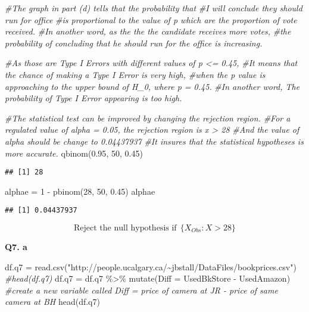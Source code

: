 \documentclass[
]{article}
\newenvironment{Shaded}{\begin{snugshade}}{\end{snugshade}}
\newcommand{\AttributeTok}[1]{\textcolor[rgb]{0.77,0.63,0.00}{#1}}
\newcommand{\CommentTok}[1]{\textcolor[rgb]{0.56,0.35,0.01}{\textit{#1}}}
\newcommand{\DecValTok}[1]{\textcolor[rgb]{0.00,0.00,0.81}{#1}}
\newcommand{\FloatTok}[1]{\textcolor[rgb]{0.00,0.00,0.81}{#1}}
\newcommand{\FunctionTok}[1]{\textcolor[rgb]{0.00,0.00,0.00}{#1}}
\newcommand{\NormalTok}[1]{#1}
\newcommand{\OtherTok}[1]{\textcolor[rgb]{0.56,0.35,0.01}{#1}}
\newcommand{\SpecialCharTok}[1]{\textcolor[rgb]{0.00,0.00,0.00}{#1}}
\newcommand{\StringTok}[1]{\textcolor[rgb]{0.31,0.60,0.02}{#1}}
\begin{document}
\begin{Shaded}
\begin{Highlighting}[]
\CommentTok{\#The graph in part (d) tells that the probability that }
\CommentTok{\#I will conclude they should run for office }
\CommentTok{\#is proportional to the value of p which are the proportion of vote received.}
\CommentTok{\#In another word, as the the the candidate receives more votes,}
\CommentTok{\#the probability of concluding that he should run for the office is increasing. }


\CommentTok{\#As those are Type I Errors with different values of p \textless{}= 0.45, }
\CommentTok{\#It means that the chance of making a Type I Error is very high, }
\CommentTok{\#when the p value is approaching to the upper bound of H\_0, where p = 0.45.}
\CommentTok{\#In another word, The probability of Type I Error appearing is too high.}

\CommentTok{\#The statistical test can be improved by changing the rejection region.}
\CommentTok{\#For a regulated value of alpha = 0.05, the rejection region is x \textgreater{} 28}
\CommentTok{\#And the value of alpha should be change to 0.04437937}
\CommentTok{\#It insures that the statistical hypotheses is more accurate.}
\FunctionTok{qbinom}\NormalTok{(}\FloatTok{0.95}\NormalTok{, }\DecValTok{50}\NormalTok{, }\FloatTok{0.45}\NormalTok{)}
\end{Highlighting}
\end{Shaded}

\begin{verbatim}
## [1] 28
\end{verbatim}

\begin{Shaded}
\begin{Highlighting}[]
\NormalTok{alphae }\OtherTok{=} \DecValTok{1} \SpecialCharTok{{-}} \FunctionTok{pbinom}\NormalTok{(}\DecValTok{28}\NormalTok{, }\DecValTok{50}\NormalTok{, }\FloatTok{0.45}\NormalTok{)}
\NormalTok{alphae}
\end{Highlighting}
\end{Shaded}

\begin{verbatim}
## [1] 0.04437937
\end{verbatim}

\[
\text{Reject the null hypothesis if} \:\: \{X_{Obs}: X > 28\}
\]

\textbf{Q7. a}

\begin{Shaded}
\begin{Highlighting}[]
\NormalTok{df.q7 }\OtherTok{=} \FunctionTok{read.csv}\NormalTok{(}\StringTok{"http://people.ucalgary.ca/\textasciitilde{}jbstall/DataFiles/bookprices.csv"}\NormalTok{)}
\CommentTok{\#head(df.q7)}
\NormalTok{df.q7 }\OtherTok{=}\NormalTok{ df.q7 }\SpecialCharTok{\%\textgreater{}\%}
  \FunctionTok{mutate}\NormalTok{(}\AttributeTok{Diff =}\NormalTok{ UsedBkStore }\SpecialCharTok{{-}}\NormalTok{ UsedAmazon) }\CommentTok{\#create a new variable called Diff = price of camera at JR {-} price of same camera at BH}
\FunctionTok{head}\NormalTok{(df.q7)}
\end{Highlighting}
\end{Shaded}
\end{document}
